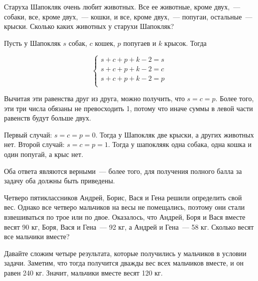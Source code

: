 ﻿


\begin{itemize}
\itA Старуха Шапокляк очень любит животных. Все ее животные, кроме двух,~— собаки, все, кроме двух,~— кошки, и все, кроме двух,~— попугаи, остальные~— крыски. Сколько каких животных у старухи Шапокляк?

\itr Пусть у Шапокляк $s$ собак, $c$ кошек, $p$ попугаев и $k$ крысок. Тогда

$$
\begin{cases}
s+c+p+k -2 = s \\
s+c+p+k -2 = c \\
s+c+p+k -2 = p \\
\end{cases}
$$

Вычитая эти равенства друг из друга, можно получить, что $s=c=p$. Более того, эти три числа обязаны не превосходить 1, потому что иначе суммы в левой части равенств будут больше двух.

Первый случай: $s=c=p=0$. Тогда у Шапокляк две крыски, а других животных нет. Второй случай: $s=c=p=1$. Тогда у шапокляяк одна собака, одна кошка и один попугай, а крыс нет.

Оба ответа являются верными~— более того, для получения полного балла за задачу оба должны быть приведены.

\itB Четверо пятиклассников Андрей, Борис, Вася и Гена решили определить свой вес. Однако  все четверо мальчиков на весы не помещались, поэтому они стали взвешиваться по трое или по двое. Оказалось, что Андрей, Боря и Вася вместе весят 90 кг, Боря, Вася и Гена~— 92 кг, а Андрей и Гена~— 58 кг. Сколько весят все мальчики вместе?

\itr Давайте сложим четыре результата, которые получились у мальчиков в условии задачи. Заметим, что тогда получится дважды вес всех мальчиков вместе, и он равен 240 кг. Значит, мальчики вместе весят 120 кг.

\end{itemize}



